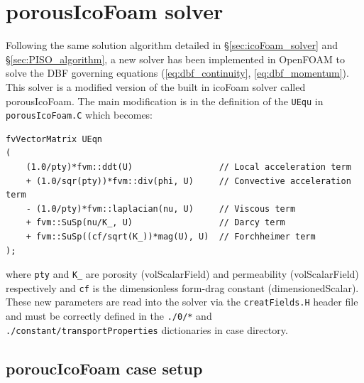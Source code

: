 \documentclass[a4paper,11pt]{report}
\begin{document}
\section{porousIcoFoam solver}
Following the same solution algorithm detailed in §\ref{sec:icoFoam_solver} and §\ref{sec:PISO_algorithm}, a new solver has been implemented in OpenFOAM to solve the DBF governing equations (\ref{eq:dbf_continuity}, \ref{eq:dbf_momentum}). This solver is a modified version of the built in icoFoam solver called porousIcoFoam. The main modification is in the definition of the \texttt{UEqu} in \texttt{porousIcoFoam.C} which becomes:
\begin{verbatim}
fvVectorMatrix UEqn
(
    (1.0/pty)*fvm::ddt(U)                 // Local acceleration term
    + (1.0/sqr(pty))*fvm::div(phi, U)     // Convective acceleration term
    - (1.0/pty)*fvm::laplacian(nu, U)     // Viscous term
    + fvm::SuSp(nu/K_, U)                 // Darcy term
    + fvm::SuSp((cf/sqrt(K_))*mag(U), U)  // Forchheimer term
);
\end{verbatim}
where \texttt{pty} and \texttt{K\_} are porosity (volScalarField) and permeability (volScalarField) respectively and \texttt{cf} is the dimensionless form-drag constant (dimensionedScalar). These new parameters are read into the solver via the \texttt{creatFields.H} header file and must be correctly defined in the \texttt{./0/*} and \texttt{./constant/transportProperties} dictionaries in case directory.

\subsection{poroucIcoFoam case setup}
\end{document}
